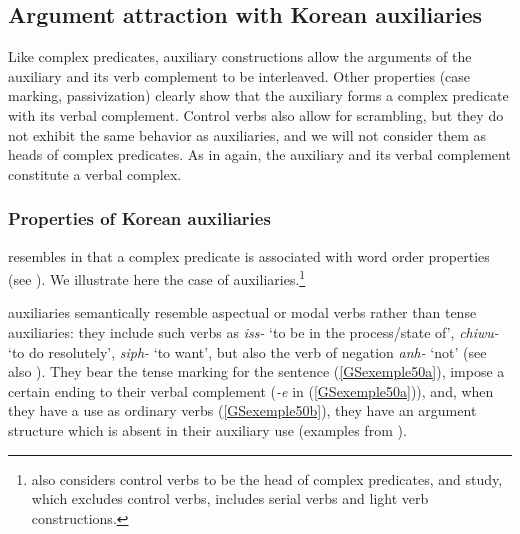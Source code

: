 \subsection{Argument attraction with Korean auxiliaries}\label{GSsection4.2}

Like  complex predicates,  auxiliary constructions allow the arguments of the auxiliary and its verb complement to be interleaved. Other properties (case marking, passivization) clearly show that the auxiliary forms a complex predicate with its verbal complement. Control verbs also allow for scrambling, but they do not exhibit the same behavior as auxiliaries, and we will not consider them as heads of complex predicates. As in  again, the auxiliary and its verbal complement constitute a verbal complex.

\subsubsection{Properties of Korean auxiliaries}\label{GSsection4.2.1}
 
\largerpage 
{} resembles  in that a complex predicate is associated with word order
properties (see \citealt{Sells1991, Chung98a-u, Yoo2003, Kim2016a-u}). We illustrate here the case
of auxiliaries.\footnote{\citet{Chung98a-u} also considers control verbs to be the head of complex
  predicates, and  study, which excludes control verbs, includes serial verbs
  and light verb constructions.}

 auxiliaries semantically resemble aspectual or modal verbs rather than tense auxiliaries:
they include such verbs as \emph{iss-} `to be in the process/state of', \emph{chiwu-} `to do
resolutely’, \emph{siph-} `to want', but also the verb of negation \emph{anh-} `not' (see also
). They bear the tense
marking for the sentence (\ref{GSexemple50a}), impose a certain ending to their verbal complement
(\emph{-e} in (\ref{GSexemple50a})), and, when they have a use as ordinary verbs
(\ref{GSexemple50b}), they have an argument structure which is absent in their auxiliary use
(examples from \citealt[85--86]{Kim2016a-u}). 

\eal
	\label{GSexemple50} 
    \label{GSexemple50a}

